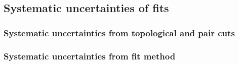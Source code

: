 \subsection{Systematic uncertainties of fits}
\label{sec:SysErrorsFits}


\subsubsection{Systematic uncertainties from topological and pair cuts}
\label{sec:SysErrorsFitsCuts}



\subsubsection{Systematic uncertainties from fit method}
\label{sec:SysErrorsFitsMethod}




